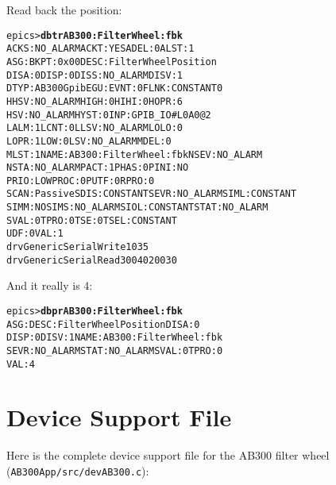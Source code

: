 \documentclass[twoside]{article}
\begin{document}
Read back the position:
\begin{alltt}
epics> {\bf dbtr AB300:FilterWheel:fbk}
ACKS: NO_ALARM      ACKT: YES           ADEL: 0             ALST: 1
ASG:                BKPT: 0x00          DESC: Filter Wheel Position
DISA: 0             DISP: 0             DISS: NO_ALARM      DISV: 1
DTYP: AB300Gpib     EGU:                EVNT: 0             FLNK:CONSTANT 0
HHSV: NO_ALARM      HIGH: 0             HIHI: 0             HOPR: 6
HSV: NO_ALARM       HYST: 0             INP:GPIB_IO #L0 A0 @2
LALM: 1             LCNT: 0             LLSV: NO_ALARM      LOLO: 0
LOPR: 1             LOW: 0              LSV: NO_ALARM       MDEL: 0
MLST: 1             NAME: AB300:FilterWheel:fbk             NSEV: NO_ALARM
NSTA: NO_ALARM      PACT: 1             PHAS: 0             PINI: NO
PRIO: LOW           PROC: 0             PUTF: 0             RPRO: 0
SCAN: Passive       SDIS:CONSTANT       SEVR: NO_ALARM      SIML:CONSTANT
SIMM: NO            SIMS: NO_ALARM      SIOL:CONSTANT       STAT: NO_ALARM
SVAL: 0             TPRO: 0             TSE: 0              TSEL:CONSTANT
UDF: 0              VAL: 1
drvGenericSerialWrite 1 \verb@\@035
drvGenericSerialRead 3 \verb@\@004\verb@\@020\verb@\@030
\end{alltt}

And it really is 4:
\begin{alltt}
epics> {\bf dbpr AB300:FilterWheel:fbk}
ASG:                DESC: Filter Wheel Position             DISA: 0
DISP: 0             DISV: 1             NAME: AB300:FilterWheel:fbk
SEVR: NO_ALARM      STAT: NO_ALARM      SVAL: 0             TPRO: 0
VAL: 4
\end{alltt}

\newpage
\section{Device Support File}
Here is the complete device support file for the AB300 filter wheel
({\tt AB300App/src/devAB300.c}):
\end{document}
